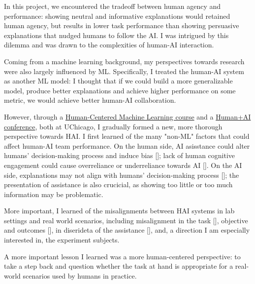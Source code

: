 

In this project, we encountered the tradeoff between human agency and performance: showing neutral and informative explanations would retained human agency, but results in lower task performance than showing persuasive explanations that nudged humans to follow the AI. 
I was intrigued by this dilemma and was drawn to the complexities of human-AI interaction. 

Coming from a machine learning background, my perspectives towards research were also largely influenced by ML. 
Specifically, I treated the human-AI system as another ML model: I thought that if we could build a more generalizable model, produce better explanations and achieve higher performance on some metric, we would achieve better human-AI collaboration. 

However, through a \href{https://github.com/ChicagoHAI/human-centered-machine-learning}{Human-Centered Machine Learning course} and a \href{https://datascience.uchicago.edu/events/human-ai-conference/}{Human+AI conference}, both at UChicago, 
I gradually formed a new, more thorough perspective towards HAI.
I first learned of the many "non-ML" factors that could affect human-AI team performance. On the human side, AI asisstance could alter humans' decision-making process and induce bias []; lack of human cognitive engagement could cause overreliance or underreliance towards AI []. On the AI side, explanations may not align with humans' decision-making process []; the presentation of assistance is also crucicial, as showing too little or too much information may be problematic.


More important, I learned of the misalignments between HAI systems in lab settings and real world scenarios, including misalignment in the task [], objective and outcomes [], in diserideta of the assistance [], and, a direction I am especially interested in, the experiment subjects. 


A more important lesson I learned was a more human-centered perspective: to take a step back and question whether the task at hand is appropriate for a real-world scenarios used by humans in practice. 



